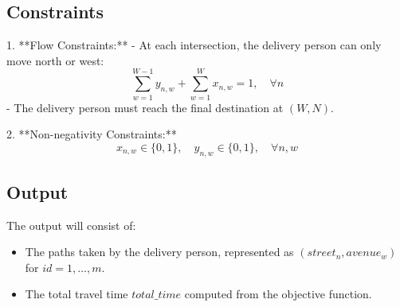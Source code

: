 \documentclass{article}
\begin{document}
\subsection*{Constraints}
1. **Flow Constraints:**
   - At each intersection, the delivery person can only move north or west:
   \[
   \sum_{w=1}^{W-1} y_{n,w} + \sum_{w=1}^{W} x_{n,w} = 1, \quad \forall n
   \]
   - The delivery person must reach the final destination at \( (W, N) \).

2. **Non-negativity Constraints:**
   \[
   x_{n,w} \in \{0, 1\}, \quad y_{n,w} \in \{0, 1\}, \quad \forall n, w
   \]

\subsection*{Output}
The output will consist of:
\begin{itemize}
    \item The paths taken by the delivery person, represented as \( (street_n, avenue_w) \) for \( id = 1, \ldots, m \).
    \item The total travel time \( total\_time \) computed from the objective function.
\end{itemize}
\end{document}
